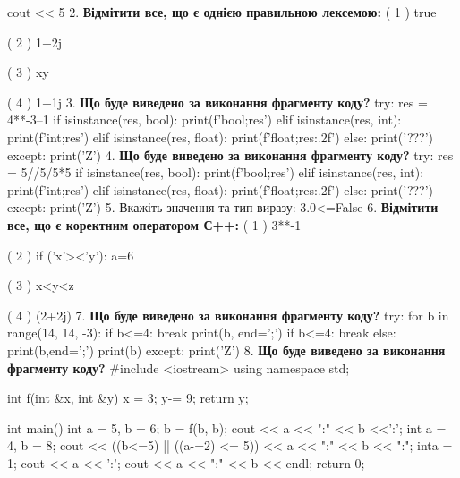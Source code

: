 \documentclass[11pt]{article}
\begin{document}
cout << 5 %
\vspace{5mm}
2. %
\textbf{Відмітити все, що є однією правильною лексемою:}
( 1 ) true

( 2 ) 1+2j

( 3 ) xy

( 4 ) 1+1j
\vspace{5mm}
3. \textbf{Що буде виведено за виконання фрагменту коду?}
try:
    res = 4**-3--1
    if isinstance(res, bool):
        print(f'bool;{res}')
    elif isinstance(res, int):
        print(f'int;{res}')
    elif isinstance(res, float):
        print(f'float;{res:.2f}')
    else:
        print('???')
except:
    print('Z')
\vspace{5mm}
4. \textbf{Що буде виведено за виконання фрагменту коду?}
try:
    res = 5//5/5*5
    if isinstance(res, bool):
        print(f'bool;{res}')
    elif isinstance(res, int):
        print(f'int;{res}')
    elif isinstance(res, float):
        print(f'float;{res:.2f}')
    else:
        print('???')
except:
    print('Z')
\vspace{5mm}
5. 
Вкажіть значення та тип виразу:
3.0<=False
\vspace{5mm}
6. %
\textbf{Відмітити все, що є коректним оператором С++:}
( 1 ) 3**-1

( 2 ) if ('x'><'y'): a=6

( 3 ) x<y<z

( 4 ) (2+2j)%
\vspace{5mm}
7. \textbf{Що буде виведено за виконання фрагменту коду?}
try:
    for b in range(14, 14, -3):
        if b<=4:
            break
        print(b, end=';')
        if b<=4:
            break
    else:
        print(b,end=';')
    print(b)
except:
    print('Z')
\vspace{5mm}
8. \textbf{Що буде виведено за виконання фрагменту коду?}
#include <iostream>
using namespace std;

int f(int &x, int &y){
    x = 3;
    y-= 9;
    return y;
}

int main(){
    int a = 5, b = 6;
    b = f(b, b);
    cout << a << ":" << b <<':';
    {
        int a = 4, b = 8;
        cout << ((b<=5) || ((a-=2) <= 5))
             << a << ":" << b << ":";
    }
    {
        inta = 1;
        cout << a << ':';
    }
    cout << a << ":" << b << endl;
    return 0;
}
\end{document}

